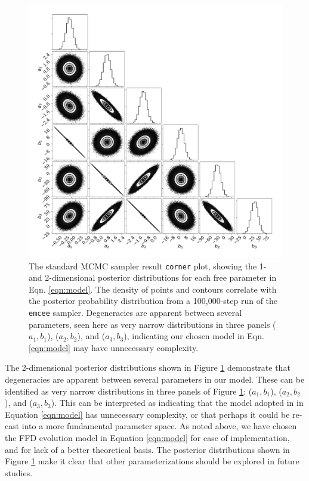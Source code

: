 \documentclass[preprint2]{aastex62}
\begin{document}
\begin{figure}[!t]
\centering
\includegraphics[width=6.25in]{fig8}
\caption{
The standard MCMC sampler result {\tt corner} plot, showing the 1- and 2-dimensional posterior distributions for each free parameter in Eqn. \ref{eqn:model}. The density of points and contours correlate with the posterior probability distribution from a 100,000-step run of the {\tt emcee} sampler. Degeneracies are apparent between several parameters, seen here as very narrow distributions in three panels ($a_1, b_1$), ($a_2, b_2$), and ($a_3, b_3$), indicating our chosen model in Eqn. \ref{eqn:model} may have unnecessary complexity.
}
\label{fig:mcmc}
\end{figure}


The 2-dimensional posterior distributions shown in Figure \ref{fig:mcmc} demonstrate that degeneracies are apparent between several parameters in our model. These can be identified as very narrow distributions in three panels of Figure \ref{fig:mcmc}: ($a_1, b_1$), ($a_2, b_2$), and ($a_3, b_3$). This can be interpreted as indicating that the model adopted in in Equation \ref{eqn:model} has unnecessary complexity, or that perhaps it could be re-cast into a more fundamental parameter space. As noted above, we have chosen the FFD evolution model in Equation \ref{eqn:model} for ease of implementation, and for lack of a better theoretical basis. The posterior distributions shown in Figure \ref{fig:mcmc} make it clear that other parameterizations should be explored in future studies.
\end{document}
